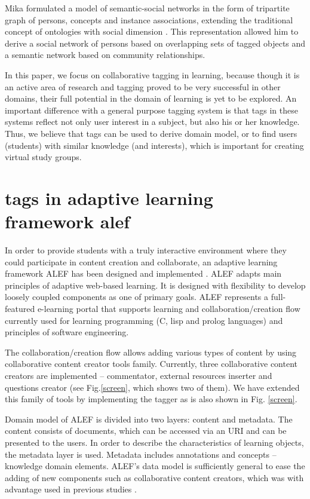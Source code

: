 \documentclass{IEEEtran}     %
\begin{document}
Mika formulated a model of semantic-social networks in
the form of tripartite graph of persons, concepts and instance
associations, extending the traditional concept of ontologies
with social dimension \cite{mika2005ontologies}. This representation allowed him
to derive a social network of persons based on overlapping
sets of tagged objects and a semantic network based on
community relationships.

In this paper, we focus on collaborative tagging in
learning, because though it is an active area of research and
tagging proved to be very successful in other domains, their
full potential in the domain of learning is yet to be explored.
An important difference with a general purpose tagging
system is that tags in these systems reflect not only user
interest in a subject, but also his or her knowledge. Thus, we
believe that tags can be used to derive domain model, or to
find users (students) with similar knowledge (and interests),
which is important for creating virtual study groups.

\section{tags in adaptive learning framework alef}
In order to provide students with a truly interactive
environment where they could participate in content creation
and collaborate, an adaptive learning framework ALEF has
been designed and implemented \cite{vsimko2010alef}. ALEF adapts main
principles of adaptive web-based learning. It is designed with
flexibility to develop loosely coupled components as one of
primary goals. ALEF represents a full-featured e-learning
portal that supports learning and collaboration/creation flow
\cite{bielikova2010personalized} currently used for learning programming (C, lisp and
prolog languages) and principles of software engineering.

The collaboration/creation flow allows adding various
types of content by using collaborative content creator tools
family. Currently, three collaborative content creators are
implemented – commentator, external resources inserter and
questions creator (see Fig.\ref{screen}, which shows two of them). We
have extended this family of tools by implementing the
tagger as is also shown in Fig. \ref{screen}.

Domain model of ALEF is divided into two layers:
content and metadata. The content consists of documents,
which can be accessed via an URI and can be presented to
the users. In order to describe the characteristics of learning
objects, the metadata layer is used. Metadata includes
annotations and concepts – knowledge domain elements.
ALEF's data model is sufficiently general to ease the adding
of new components such as collaborative content creators,
which was with advantage used in previous studies \cite{unvcik2010annotating}.
\end{document}
